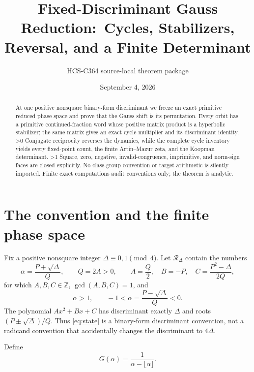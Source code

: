 \documentclass[10pt]{article}
\title{Fixed-Discriminant Gauss Reduction:\
Cycles, Stabilizers, Reversal, and a Finite Determinant}
\author{HCS-C364 source-local theorem package}
\date{September 4, 2026}
\providecommand{\CRevisionRound}{2}
\newcommand{\Z}{\mathbb Z}
\begin{document}
\maketitle

\begin{abstract}
At one positive nonsquare binary-form discriminant we freeze an exact
primitive reduced phase space and prove that the Gauss shift is its
permutation.  Every orbit has a primitive continued-fraction word whose
positive matrix product is a hyperbolic stabilizer; the same matrix gives an
exact cycle multiplier and its discriminant identity.
\ifnum\CRevisionRound>0
Conjugate reciprocity reverses the dynamics, while the complete cycle
inventory yields every fixed-point count, the finite Artin--Mazur zeta, and
the Koopman determinant.
\fi
\ifnum\CRevisionRound>1
Square, zero, negative, invalid-congruence, imprimitive, and norm-sign faces
are closed explicitly.  No class-group convention or target arithmetic is
silently imported.
\fi
Finite exact computations audit conventions only; the theorem is analytic.
\end{abstract}

\section{The convention and the finite phase space}
Fix a positive nonsquare integer \(\Delta\equiv0,1\pmod4\).  Let
\(\mathcal R_\Delta\) contain the numbers
\begin{equation}\label{eq:state}
 \alpha=\frac{P+\sqrt\Delta}{Q},\qquad Q=2A>0,
 \qquad A=\frac Q2,\quad B=-P,\quad C=\frac{P^2-\Delta}{2Q},
\end{equation}
for which \(A,B,C\in\Z\), \(\gcd(A,B,C)=1\), and
\begin{equation}\label{eq:reduced}
 \alpha>1,\qquad -1<\bar\alpha=\frac{P-\sqrt\Delta}{Q}<0.
\end{equation}
The polynomial \(Ax^2+Bx+C\) has discriminant exactly \(\Delta\) and roots
\((P\pm\sqrt\Delta)/Q\).  Thus \eqref{eq:state} is a binary-form
discriminant convention, not a radicand convention that accidentally changes
the discriminant to \(4\Delta\).

Define
\begin{equation}\label{eq:gauss}
 G(\alpha)=\frac1{\alpha-\lfloor\alpha\rfloor}.
\end{equation}
\end{document}
